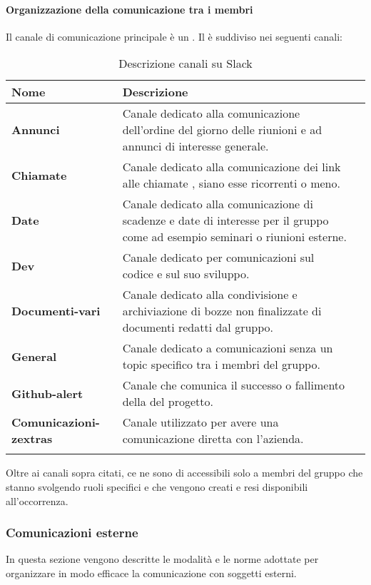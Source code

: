 \paragraph*{Organizzazione della comunicazione tra i membri }
Il canale di comunicazione principale è un  .
Il  è suddiviso nei seguenti canali:

\setlength{\freewidth}{\dimexpr\textwidth-0\tabcolsep}
	\renewcommand{\arraystretch}{1.5}
	\setlength{\aboverulesep}{0pt}
	\setlength{\belowrulesep}{0pt}
	\begin{longtable}{L{.210\freewidth} L{.6\freewidth} L{.080\freewidth}}
		\textbf{Nome} & \textbf{Descrizione} \\
		\toprule
		\endhead		
		\textbf{Annunci} & Canale dedicato alla comunicazione dell'ordine del giorno delle riunioni e ad annunci di interesse generale. \\
		\textbf{Chiamate} & Canale dedicato alla comunicazione dei link alle chiamate , siano esse ricorrenti o meno. \\
		 \textbf{Date} & Canale dedicato alla comunicazione di scadenze e date di interesse per il gruppo come ad esempio seminari o riunioni esterne. \\
		 \textbf{Dev} & Canale dedicato per comunicazioni sul codice e sul suo sviluppo. \\
		\textbf{Documenti-vari} & Canale dedicato alla condivisione e archiviazione di bozze non finalizzate di documenti redatti dal gruppo. \\
		 \textbf{General} & Canale dedicato a comunicazioni senza un topic specifico tra i membri del gruppo. \\
		 \textbf{Github-alert} & Canale che comunica il successo o fallimento della  del progetto. \\
		 \textbf{Comunicazioni-zextras} & Canale utilizzato per avere una comunicazione diretta con l'azienda. \\
		\bottomrule
		\hiderowcolors
		\caption{Descrizione canali su Slack}
	\end{longtable}
Oltre ai canali sopra citati, ce ne sono di accessibili solo a membri del gruppo che stanno svolgendo ruoli specifici e che vengono creati e resi disponibili all'occorrenza.
\subsubsection{Comunicazioni esterne}
In questa sezione vengono descritte le modalità e le norme adottate per organizzare in modo efficace la comunicazione con soggetti esterni.
